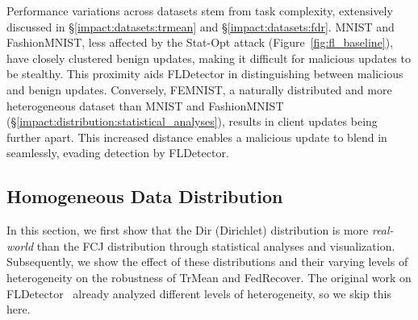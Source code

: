Performance variations across datasets stem from task complexity, extensively discussed in \S\ref{impact:datasets:trmean} and \S\ref{impact:datasets:fdr}. MNIST and FashionMNIST, less affected by the Stat-Opt attack (Figure~\ref{fig:fl_baseline}), have closely clustered benign updates, making it difficult for malicious updates to be stealthy. This proximity aids FLDetector in distinguishing between malicious and benign updates. Conversely, FEMNIST, a naturally distributed and more heterogeneous dataset than MNIST and FashionMNIST (\S\ref{impact:distribution:statistical_analyses}), results in client updates being further apart. This increased distance enables a malicious update to blend in seamlessly, evading detection by FLDetector.
\subsection{Homogeneous Data Distribution}\label{impact:distribution}
In this section, we first show that the Dir (Dirichlet) distribution is more \emph{real-world} than the FCJ distribution through statistical analyses and visualization. Subsequently, we show the effect of these distributions and their varying levels of heterogeneity on the robustness of TrMean and FedRecover. The original work on FLDetector~\cite{zhang2022fldetector} already analyzed different levels of heterogeneity, so we skip this here.
